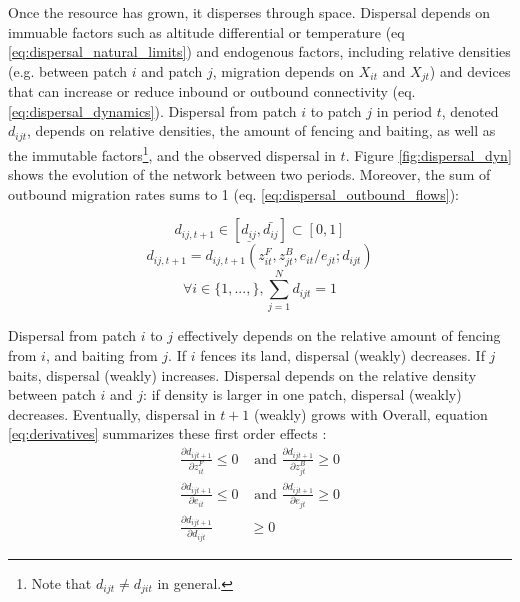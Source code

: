 \documentclass{article}
\begin{document}
Once the resource has grown, it disperses through space. Dispersal depends on immuable factors such as altitude differential or temperature (eq \ref{eq:dispersal_natural_limits}) and endogenous factors, including relative densities (e.g. between patch $i$ and patch $j$, migration depends on $X_{it}$ and $X_{jt}$) and devices that can increase or reduce inbound or outbound connectivity (eq. \ref{eq:dispersal_dynamics}).
Dispersal from patch $i$ to patch $j$ in period $t$, denoted $d_{ijt}$, depends on relative densities, the amount of fencing and baiting, as well as the immutable factors\footnote{Note that $d_{ijt} \neq d_{jit}$ in general.}, and the observed dispersal in $t$. Figure \ref{fig:dispersal_dyn} shows the evolution of the network between two periods.
Moreover, the sum of outbound migration rates sums to 1 (eq. \ref{eq:dispersal_outbound_flows}): 


\begin{equation}
d_{ij, t+1} \in [\underline{d_{ij}}, \bar{d_{ij}}] \subset [0,1] \label{eq:dispersal_natural_limits}
\end{equation}
\begin{equation}
d_{ij, t+1} = d_{ij, t+1}\left(z_{it}^F, z_{jt}^B, e_{it}/ e_{jt}; d_{ijt}\right) \label{eq:dispersal_dynamics}
\end{equation}
\begin{equation}
\forall i \in \{1,...,\}, \sum_{j=1}^N d_{ijt} = 1
\label{eq:dispersal_outbound_flows}
\end{equation}

Dispersal from patch $i$ to $j$ effectively depends on the relative amount of fencing from $i$, and baiting from $j$. If $i$ fences its land, dispersal (weakly) decreases. If $j$ baits, dispersal (weakly) increases. Dispersal depends on the relative density between patch $i$ and $j$: if density is larger in one patch, dispersal (weakly) decreases. Eventually, dispersal in $t+1$ (weakly) grows with 
Overall, equation \ref{eq:derivatives} summarizes these first order effects : 
\begin{equation}
\begin{aligned}
	\frac{\partial d_{ijt+1}}{\partial z_{it}^F} \leq 0 &\text{ and } \frac{\partial d_{ijt+1}}{\partial z_{jt}^B} \geq 0\\	
	\frac{\partial d_{ijt+1}}{\partial e_{it}	}  \leq 0 & \text{ and }\frac{\partial d_{ijt+1}}{\partial e_{jt}	}  \geq 0 \\
	\frac{\partial d_{ijt+1}}{\partial d_{ijt}} & \geq 0
\end{aligned}
\label{eq:derivatives}
\end{equation}
\end{document}
